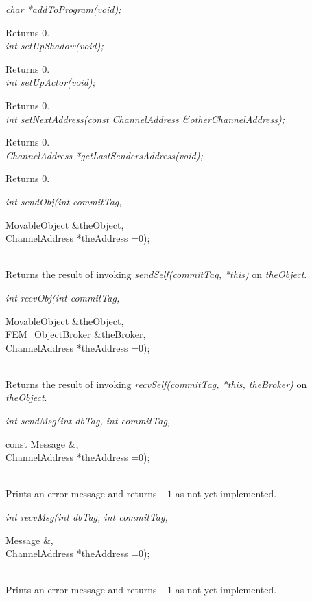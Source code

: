 {\em char *addToProgram(void); }

Returns $0$. \\

{\em int setUpShadow(void);}

Returns $0$. \\

{\em int setUpActor(void);}

Returns $0$. \\

{\em int setNextAddress(const ChannelAddress \&otherChannelAddress);}

Returns $0$. \\

{\em ChannelAddress *getLastSendersAddress(void);}

Returns $0$. \\

{\em int sendObj(int commitTag, 

\indent\indent\indent\indent\indent		MovableObject \&theObject, \\
\indent\indent\indent\indent\indent		ChannelAddress *theAddress =0);}\\
Returns the result of invoking {\em sendSelf(commitTag, *this)} on
{\em theObject}. \\

{\em int recvObj(int commitTag, 

\indent\indent\indent\indent\indent		MovableObject \&theObject, \\
\indent\indent\indent\indent\indent		FEM\_ObjectBroker \&theBroker, \\
\indent\indent\indent\indent\indent		ChannelAddress *theAddress =0);}\\
Returns the result of invoking {\em recvSelf(commitTag, *this, theBroker)} on
{\em theObject}. \\
		
{\em int sendMsg(int dbTag, int commitTag,  

\indent\indent\indent\indent\indent		const Message \&, \\
\indent\indent\indent\indent\indent		ChannelAddress *theAddress =0);}\\
Prints an error message and returns $-1$ as not yet implemented. \\

{\em int recvMsg(int dbTag, int commitTag, 

\indent\indent\indent\indent\indent		Message \&, \\
\indent\indent\indent\indent\indent		ChannelAddress *theAddress =0);}\\
Prints an error message and returns $-1$ as not yet implemented. \\

